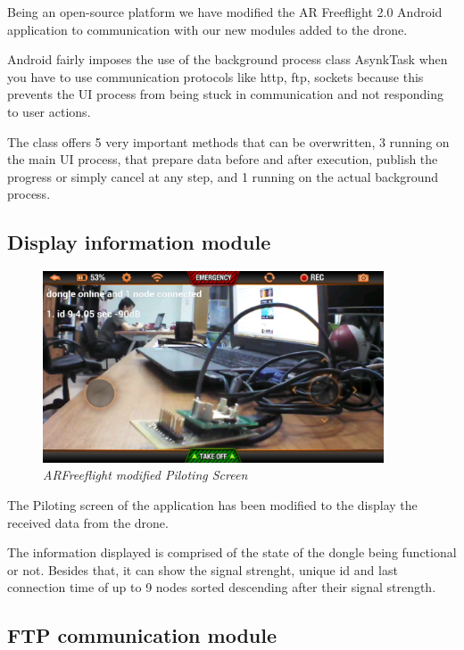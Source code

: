 Being an open-source platform we have modified the AR Freeflight 2.0 Android application to communication with our new modules added to the drone.

Android fairly imposes the use of the background process class AsynkTask when you have to use communication protocols like http, ftp, sockets because this prevents the UI process from being stuck in communication and not responding to user actions.

The class offers 5 very important methods that can be overwritten, 3 running on the main UI process, that prepare data before and after execution, publish the progress or simply cancel at any step, and 1 running on the actual background process.


\subsection{Display information module}

\begin{figure}[ht]
\begin{center}
\includegraphics[width=0.9\textwidth]{implementation/android_info.png}
\end{center}
\caption{\small \itshape{ARFreeflight modified Piloting Screen}}
\end{figure}

The Piloting screen of the application has been modified to the display the received data from the drone.

The information displayed is comprised of the state of the dongle being functional or not. Besides that, it can show the signal strenght, unique id and last connection time of up to 9 nodes sorted descending after their signal strength.

\subsection{FTP communication module}

